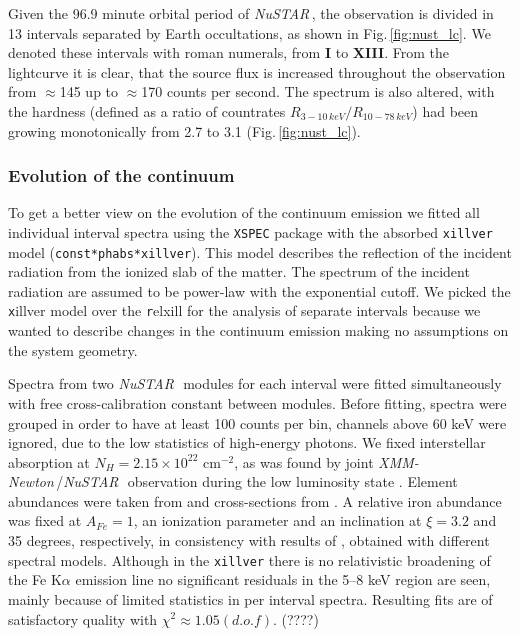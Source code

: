 \documentclass[a4paper,fleqn,usenatbib]{mnras}
\def\xmm{{\em XMM-Newton\,}}
\def\nustar{{\em NuSTAR\,}}
\begin{document}
Given the 96.9 minute orbital period of \nustar, the observation is divided in 13 intervals separated by Earth occultations, as shown in Fig.\,\ref{fig:nust_lc}. 
We denoted these intervals with roman numerals, from {\bf I} to {\bf XIII}. 
From the lightcurve it is clear, that the source flux is increased throughout the observation from $\approx$145 up to $\approx$170 counts per second. 
The spectrum is also altered, with the hardness (defined as a ratio of countrates  $R_{3-10\,keV}/R_{10-78\,keV}$) had been growing monotonically from 2.7 to 3.1 (Fig.\,\ref{fig:nust_lc}). 


\subsubsection{Evolution of the continuum}
\label{sec:continuum_evolution}
To get a better view on the evolution of the continuum emission we fitted all individual interval spectra using the \texttt{XSPEC} package \citep{arnaud96} with the absorbed \texttt{xillver} \citep{garcia13} model (\texttt{const*phabs*xillver}). 
This model describes the reflection of the incident radiation from the ionized slab of the matter. 
The spectrum of the incident radiation are assumed to be power-law with the exponential cutoff. 
We picked the {\texttt xillver} model over the {\texttt relxill} for the analysis of separate intervals because we wanted to describe changes in the continuum emission making no assumptions on the system geometry. 

Spectra from two \nustar\, modules for each interval were fitted simultaneously with free cross-calibration constant between modules.
Before fitting, spectra were grouped in order to have at least 100 counts per bin, channels above 60 keV were ignored, due to the low statistics of high-energy photons. 
We fixed interstellar absorption at $N_{H} = 2.15\times10^{22}$ cm$^{-2}$, as was found by joint \xmm/\nustar\, observation during the low luminosity state \citep{fuerst16}. 
Element abundances were taken from \cite{wilms00} and cross-sections from \cite{verner96}. 
A relative iron abundance was fixed at  $A_{Fe} = 1$, an ionization parameter and an inclination at $\xi=3.2$ and 35 degrees, respectively, in consistency with results of \citet{miller15_nust}, obtained with different spectral models. 
Although in the \texttt{xillver} there is no relativistic broadening of the Fe K$\alpha$ emission line no significant residuals in the 5--8 keV region are seen, mainly because of limited statistics in per interval spectra. 
Resulting fits are of satisfactory quality with $\chi^{2} \approx 1.05 (d.o.f)$. (????) 
 
\end{document}
